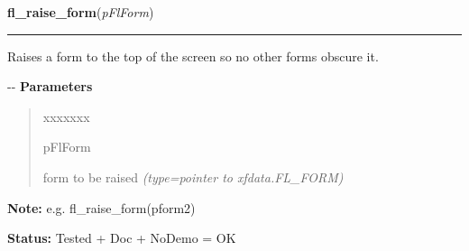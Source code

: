 \hspace{.8\funcindent}\begin{boxedminipage}{\funcwidth}

    \raggedright \textbf{fl\_raise\_form}(\textit{pFlForm})

    \vspace{-1.5ex}

    \rule{\textwidth}{0.5\fboxrule}
\setlength{\parskip}{2ex}

Raises a form to the top of the screen so no other forms obscure it.

-{}-
\setlength{\parskip}{1ex}
      \textbf{Parameters}
      \vspace{-1ex}

      \begin{quote}
        \begin{Ventry}{xxxxxxx}

          \item[pFlForm]


form to be raised
            {\it (type=pointer to xfdata.FL\_FORM)}

        \end{Ventry}

      \end{quote}

\textbf{Note:} 
e.g. fl\_raise\_form(pform2)


\textbf{Status:} 
Tested + Doc + NoDemo = OK


    \end{boxedminipage}

    \label{xformslib:flxbasic:fl_lower_form}

    \vspace{0.5ex}

